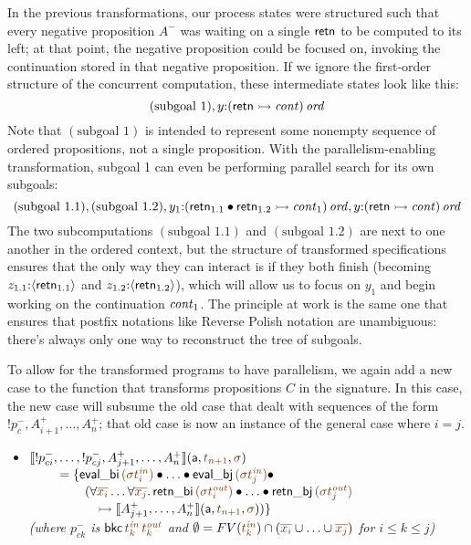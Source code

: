 In the previous transformations, our process states were structured
such that every negative proposition $A^-$ was waiting on a single
${\sf retn}$ to be computed to its left; at that point, the negative
proposition could be focused on, invoking the
continuation stored in that negative proposition. If we ignore the
first-order structure of the concurrent computation, these
intermediate states look like this:
\[
  (\mbox{subgoal 1}), y{:}{({\sf retn} \rightarrowtail {\it cont})}\,{{\it ord}}
\]
Note that $(\mbox{subgoal 1})$ is intended to represent some nonempty
sequence of ordered propositions, not a single proposition. With the
parallelism-enabling transformation, subgoal 1 can even be performing
parallel search for its own subgoals:
\[
 (\mbox{subgoal 1.1}), (\mbox{subgoal 1.2}), 
   y_1{:}{({\sf retn}_{1.1} \mathbin{\bullet} {\sf retn}_{1.2} \rightarrowtail {\it cont}_1)}\,{{\it ord}}, 
   y{:}{({\sf retn} \rightarrowtail {\it cont})}\,{{\it ord}}
\]
The two subcomputations $(\mbox{subgoal 1.1})$ and $(\mbox{subgoal
  1.2})$ are next to one another in the ordered context, but the
structure of transformed specifications ensures that the only way they
can interact is if they both finish (becoming $z_{1.1}{:}\langle {{\sf
    retn}_{1.1}} \rangle$ and $z_{1.2}{:}\langle {{\sf retn}_{1.2}} \rangle$), which will
allow us to focus on $y_1$ and begin working on the continuation ${\it
  cont}_1$. The principle at work is the same one that ensures that postfix
notations like Reverse Polish notation are unambiguous: there's always
only one way to reconstruct the tree of subgoals. 

To allow for the transformed programs to have parallelism, we again
add a new case to the function that transforms propositions $C$ in the
signature.  In this case, the new case will subsume the old
case that dealt with sequences of the form ${!}p_c^-,
A^+_{i+1},\ldots,A^+_n$; that old case is now an instance of the
general case where $i = j$. 

\begin{itemize}
\item $\opbasic{{!}p^-_{ci},\ldots,{!}p^-_{cj},A^+_{j+1},\ldots,A^+_n}{t_{n+1}}{\sigma}$
  \\
  $~ \qquad = \{ {\sf eval\_bi}\,\lf{({\sigma}t^{\it in}_i)} 
                    \fuse \ldots \fuse
                 {\sf eval\_bj}\,\lf{({\sigma}t^{\it in}_j)} \fuse ~$
  \\
  $~ \qquad \qquad (\forall\lf{\overline{x_i}}\ldots\forall\lf{\overline{x_j}}.\, 
     {\sf retn\_bi}\,\lf{(\sigma{t^{\it out}_i})}
     \fuse \ldots \fuse 
     {\sf retn\_bj}\,\lf{(\sigma{t^{\it out}_j})}$
  \\
  $~ \qquad \qquad \quad
   \lefti \opbasic{A^+_{j+1},\ldots,A^+_n}{t_{n+1}}{\sigma}) \}$\\
  {\it (where
   $p^-_{ck}$ is ${\sf bkc}\,\lf{t^{\it in}_k}\,\lf{t^{\it out}_k}$ 
   and $\emptyset = FV(\lf{t_k^{\it in}}) \cap (\lf{\overline{x_i}} \cup \ldots \cup \lf{\overline{x_j}})$ 
   for $i \leq k \leq j$)}
\end{itemize}

